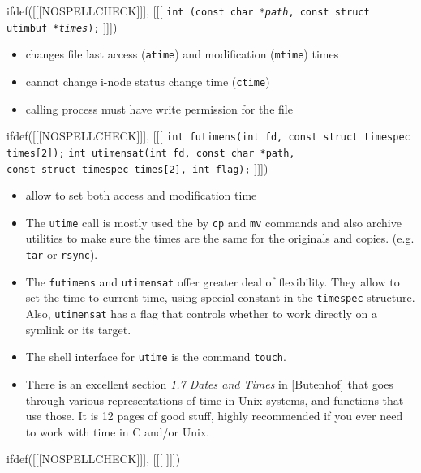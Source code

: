 \begin{slide}
ifdef([[[NOSPELLCHECK]]], [[[
\texttt{int (const char *\emph{path},
const struct utimbuf *\emph{times});}
]]])
\begin{itemize}
\item changes file last access (\texttt{atime}) and modification
(\texttt{mtime}) times
\item cannot change i-node status change time (\texttt{ctime})
\item calling process must have write permission for the file
\end{itemize}
ifdef([[[NOSPELLCHECK]]], [[[
\texttt{int futimens(int fd, const struct timespec times[2]);}
\texttt{int utimensat(int fd, const char *path, \\
    const struct timespec times[2], int flag);}
]]])
\begin{itemize}
\item allow to set both access and modification time
\end{itemize}
\end{slide}

\begin{itemize}
\item The \texttt{utime} call is mostly used the by \texttt{cp} and \texttt{mv}
commands and also archive utilities to make sure the times are the same for the
originals and copies. (e.g. \texttt{tar} or \texttt{rsync}).
\item The \texttt{futimens} and \texttt{utimensat} offer greater deal of
flexibility. They allow to set the time to current time, using special
constant in the \texttt{timespec} structure. Also, \texttt{utimensat}
has a flag that controls whether to work directly on a symlink or its target.
\item The shell interface for \texttt{utime} is the command \texttt{touch}.
\item There is an excellent section \emph{1.7 Dates and Times} in [Butenhof]
that goes through various representations of time in Unix systems, and functions
that use those.  It is 12 pages of good stuff, highly recommended if you ever
need to work with time in C and/or Unix.
\end{itemize}


ifdef([[[NOSPELLCHECK]]], [[[
]]])

